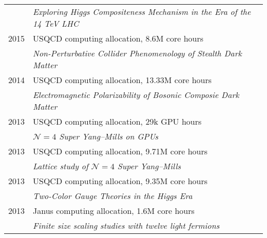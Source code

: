 \begin{spacelistout}
\begin{tabular}[t]{cl}
           & \textit{Exploring Higgs Compositeness Mechanism in the Era of the 14 TeV LHC}                                                                     \\[6 pt]
      2015 & USQCD computing allocation, 8.6M core hours                                                                                                       \\ %
           & \textit{Non-Perturbative Collider Phenomenology of Stealth Dark Matter}                                                                           \\[6 pt]
      2014 & USQCD computing allocation, 13.33M core hours                                                                                                     \\ %
           & \textit{Electromagnetic Polarizability of Bosonic Composie Dark Matter}                                                                           \\[6 pt]
      2013 & USQCD computing allocation, 29k GPU hours                                                                                                         \\ %
           & \textit{$\mathcal N = 4$ Super Yang--Mills on GPUs}                                                                                               \\[6 pt]
      2013 & USQCD computing allocation, 9.71M core hours                                                                                                      \\ %
           & \textit{Lattice study of $\mathcal N = 4$ Super Yang--Mills}                                                                                      \\[6 pt]
      2013 & USQCD computing allocation, 9.35M core hours                                                                                                      \\ %
           & \textit{Two-Color Gauge Theories in the Higgs Era}                                                                                                \\[6 pt]
      2013 & Janus computing allocation, 1.6M core hours                                                                                                       \\ %
           & \textit{Finite size scaling studies with twelve light fermions}                                                                                   \\[6 pt]

\end{tabular}
\end{spacelistout}
